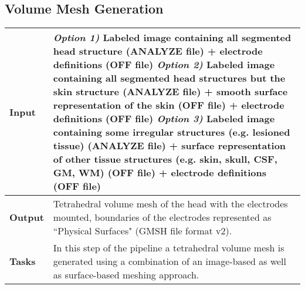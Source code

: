 \subsection{Volume Mesh Generation}
\begin{tabular}{ | p{} || p{} | }
    \hline
    \textbf{Input}  & \emph{Option 1)} Labeled image containing all segmented head structure (ANALYZE file) + 
                      electrode definitions (OFF file) \newline
                      \emph{Option 2)} Labeled image containing all segmented head structures but the skin
                      structure (ANALYZE file) +  smooth surface representation of the skin (OFF file)
                      + electrode definitions (OFF file) 
                      \emph{Option 3)} Labeled image containing some irregular structures (e.g. lesioned tissue) (ANALYZE file) + 
                      surface representation of other tissue structures (e.g. skin, skull, CSF, GM, WM) (OFF file) +
                      electrode definitions (OFF file)\\
    \hline
    \textbf{Output} & Tetrahedral volume mesh of the head with the electrodes mounted, boundaries of the
                      electrodes represented as ``Physical Surfaces" (GMSH file format v2). \\
    \hline
    \textbf{Tasks} & In this step of the pipeline a tetrahedral volume mesh is generated using a combination
                     of an image-based as well as surface-based meshing approach.\\
    \hline
\end{tabular}

\hspace{0.5cm}

